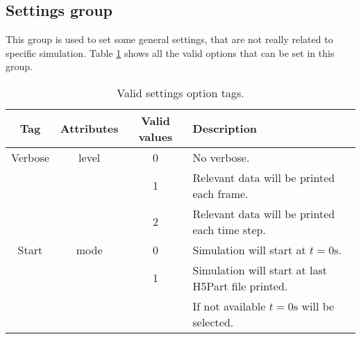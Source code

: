 \subsection{Settings group}
\label{sss:XML:Settings}
%
This group is used to set some \NAME general settings, that are not really
related to specific simulation. Table \ref{tables:caseSetup:Settings:Options}
shows all the valid options that can be set in this group.
%
\begin{table}[h!b!p!]\small
	\centering
	\begin{tabular}{| c | c | c | l | }
		\hline
		\cellcolor[rgb]{0.7,0.7,0.7}Tag & \cellcolor[rgb]{0.7,0.7,0.7}Attributes & \cellcolor[rgb]{0.7,0.7,0.7}Valid values & \cellcolor[rgb]{0.7,0.7,0.7}Description \\
		\hline
		Verbose & level & 0 & No verbose. \\
		        &       & 1 & Relevant data will be printed each frame. \\
		        &       & 2 & Relevant data will be printed each time step. \\
		\hline
		Start   & mode  & 0 & Simulation will start at $t = 0 \mathrm{s}$. \\
		        &       & 1 & Simulation will start at last H5Part file printed. \\
		        &       &   & If not available $t = 0 \mathrm{s}$ will be selected. \\
		\hline
	\end{tabular}
	\caption{Valid settings option tags.}
	\label{tables:caseSetup:Settings:Options}
\end{table}
%
